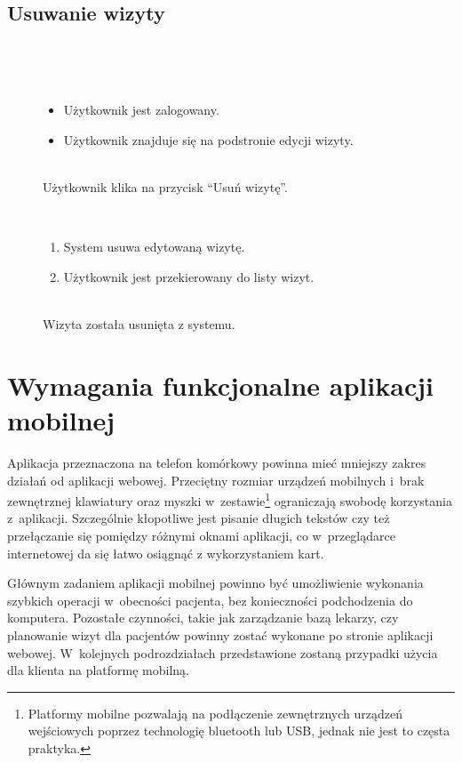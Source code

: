 \documentclass[11pt]{aghdpl}
\begin{document}
\subsection{Usuwanie wizyty}

	\begin{description}
		\item[\useCaseAktor] \hfill \\
			\useCaseUzytkownik
		\item[\useCaseWarPocz] \hfill \\
			\begin{itemize}
				\item Użytkownik jest zalogowany.
				\item Użytkownik znajduje się na podstronie edycji wizyty.
			\end{itemize}
		\item[\useCaseZdarzInicj] \hfill \\
			Użytkownik klika na przycisk ``Usuń wizytę''.
		\item[\useCaseScenBaz] \hfill \\ 
			\begin{enumerate}
				\item System usuwa edytowaną wizytę.
				\item Użytkownik jest przekierowany do listy wizyt.
			\end{enumerate}
		\item[\useCaseWarKonc] \hfill \\ 
			Wizyta została usunięta z systemu.
	\end{description}

\section{Wymagania funkcjonalne aplikacji mobilnej}

Aplikacja przeznaczona na telefon komórkowy powinna mieć mniejszy zakres działań od aplikacji webowej. Przeciętny rozmiar urządzeń mobilnych i~brak zewnętrznej klawiatury oraz myszki w~zestawie\footnote{Platformy mobilne pozwalają na podłączenie zewnętrznych urządzeń wejściowych poprzez technologię bluetooth lub USB, jednak nie jest to częsta praktyka.} ograniczają swobodę korzystania z~aplikacji. Szczególnie kłopotliwe jest pisanie długich tekstów czy też przełączanie się pomiędzy różnymi oknami aplikacji, co w~przeglądarce internetowej da się łatwo osiągnąć z wykorzystaniem kart.

Głównym zadaniem aplikacji mobilnej powinno być umożliwienie wykonania szybkich operacji w~obecności pacjenta, bez konieczności podchodzenia do komputera. Pozostałe czynności, takie jak zarządzanie bazą lekarzy, czy planowanie wizyt dla pacjentów powinny zostać wykonane po stronie aplikacji webowej. W~kolejnych podrozdziałach przedstawione zostaną przypadki użycia dla klienta na platformę mobilną.
\end{document}
